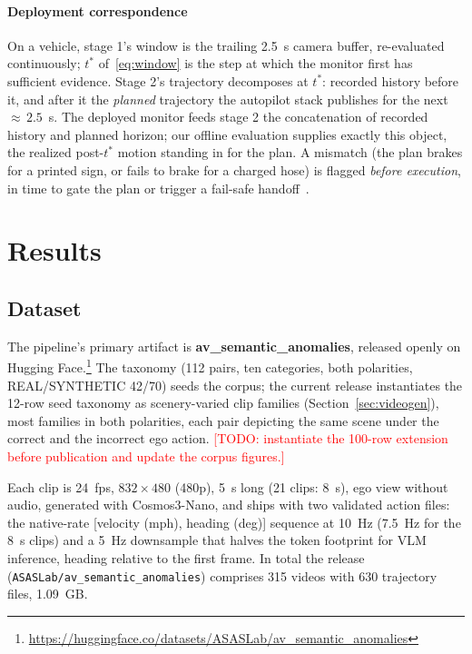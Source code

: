 \documentclass[conference]{IEEEtran}
\newcommand{\todo}[1]{\textcolor{red}{[TODO: #1]}}
\begin{document}
\paragraph{Deployment correspondence} On a vehicle, stage 1's window is the trailing 2.5~s camera buffer, re-evaluated continuously; $t^*$ of~\eqref{eq:window} is the step at which the monitor first has sufficient evidence. Stage 2's trajectory decomposes at $t^*$: recorded history before it, and after it the \emph{planned} trajectory the autopilot stack publishes for the next ${\approx}\,2.5$~s. The deployed monitor feeds stage 2 the concatenation of recorded history and planned horizon; our offline evaluation supplies exactly this object, the realized post-$t^*$ motion standing in for the plan. A mismatch (the plan brakes for a printed sign, or fails to brake for a charged hose) is flagged \emph{before execution}, in time to gate the plan or trigger a fail-safe handoff~\cite{b13,b31}.

\section{Results}\label{sec:results}

\subsection{Dataset}\label{sec:dataset}

The pipeline's primary artifact is \textbf{av\_semantic\_anomalies}, released openly on Hugging Face.\footnote{\url{https://huggingface.co/datasets/ASASLab/av_semantic_anomalies}} The taxonomy (112 pairs, ten categories, both polarities, REAL/SYNTHETIC 42/70) seeds the corpus; the current release instantiates the 12-row seed taxonomy as scenery-varied clip families (Section~\ref{sec:videogen}), most families in both polarities, each pair depicting the same scene under the correct and the incorrect ego action. \todo{instantiate the 100-row extension before publication and update the corpus figures.}

Each clip is 24~fps, $832\times480$ (480p), 5~s long (21 clips: 8~s), ego view without audio, generated with Cosmos3-Nano, and ships with two validated action files: the native-rate [velocity (mph), heading (deg)] sequence at 10~Hz (7.5~Hz for the 8~s clips) and a 5~Hz downsample that halves the token footprint for VLM inference, heading relative to the first frame. In total the release (\texttt{ASASLab/av\_semantic\_anomalies}) comprises 315 videos with 630 trajectory files, 1.09~GB.
\end{document}
